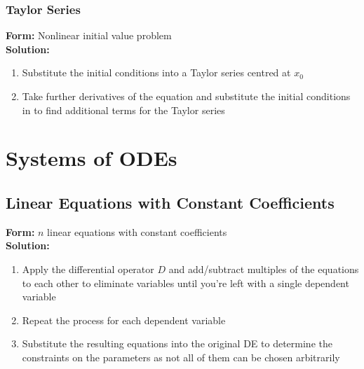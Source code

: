 \documentclass{article}
\begin{document}
\subsubsection{Taylor Series}

\textbf{Form:} Nonlinear initial value problem \\ \textbf{Solution:} \begin{enumerate}
  \item Substitute the initial conditions into a Taylor series centred at $x_0$

  \item Take further derivatives of the equation and substitute the initial conditions in to find additional terms for the Taylor series
\end{enumerate}

\section{Systems of ODEs}

\subsection{Linear Equations with Constant Coefficients}

\textbf{Form:} $n$ linear equations with constant coefficients \\ \textbf{Solution:} \begin{enumerate}
  \item Apply the differential operator $D$ and add/subtract multiples of the equations to each other to eliminate variables until you're left with a single dependent variable

  \item Repeat the process for each dependent variable

  \item Substitute the resulting equations into the original DE to determine the constraints on the parameters as not all of them can be chosen arbitrarily
\end{enumerate}
\end{document}
